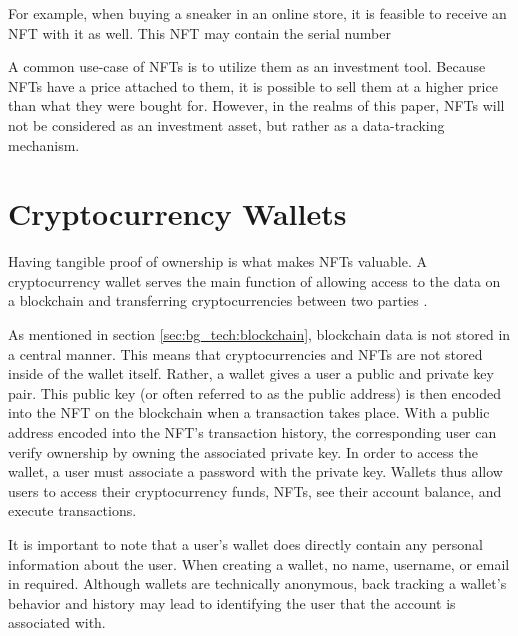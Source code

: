
For example, when buying a sneaker in an online store, it is feasible to receive an NFT with it as well. This NFT may contain the serial number %

A common use-case of NFTs is to utilize them as an investment tool. Because NFTs have a price attached to them, it is possible to sell them at a higher price than what they were bought for. However, in the realms of this paper, NFTs will not be considered as an investment asset, but rather as a data-tracking mechanism. %

%
%
\section{Cryptocurrency Wallets}
\label{sec:bg_tech:wallets}

Having tangible proof of ownership is what makes NFTs valuable. A cryptocurrency wallet serves the main function of allowing access to the data on a blockchain and transferring cryptocurrencies between two parties \cite{wallets1}.

As mentioned in section \ref{sec:bg_tech:blockchain}, blockchain data is not stored in a central manner. This means that cryptocurrencies and NFTs are not stored inside of the wallet itself. Rather, a wallet gives a user a public and private key pair. This public key (or often referred to as the public address) is then encoded into the NFT on the blockchain when a transaction takes place. With a public address encoded into the NFT's transaction history, the corresponding user can verify ownership by owning the associated private key. In order to access the wallet, a user must associate a password with the private key. Wallets thus allow users to access their cryptocurrency funds, NFTs, see their account balance, and execute transactions. \cite{wallets2}

It is important to note that a user's wallet does directly contain any personal information about the user. When creating a wallet, no name, username, or email in required. Although wallets are technically anonymous, back tracking a wallet's behavior and history may lead to identifying the user that the account is associated with.

